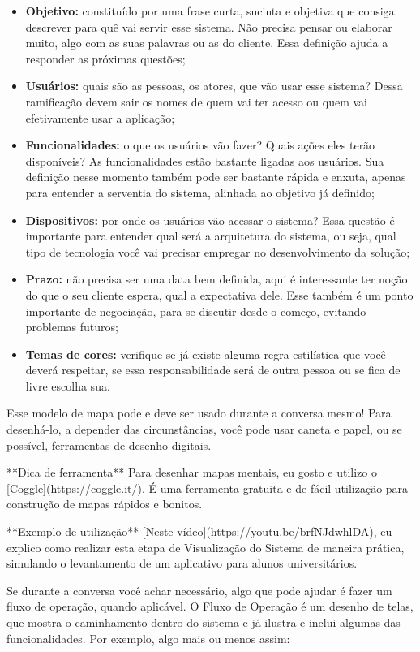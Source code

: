 \documentclass[a4paper, 12pt, oneside]{book}
\begin{document}
\begin{itemize}
    \item \textbf{Objetivo:} constituído por uma frase curta, sucinta e objetiva que consiga descrever para quê vai servir esse sistema. Não precisa pensar ou elaborar muito, algo com as suas palavras ou as do cliente. Essa definição ajuda a responder as próximas questões;
    \item \textbf{Usuários:} quais são as pessoas, os atores, que vão usar esse sistema? Dessa ramificação devem sair os nomes de quem vai ter acesso ou quem vai efetivamente usar a aplicação;
    \item \textbf{Funcionalidades:} o que os usuários vão fazer? Quais ações eles terão disponíveis? As funcionalidades estão bastante ligadas aos usuários. Sua definição nesse momento também pode ser bastante rápida e enxuta, apenas para entender a serventia do sistema, alinhada ao objetivo já definido;
    \item \textbf{Dispositivos:} por onde os usuários vão acessar o sistema? Essa questão é importante para entender qual será a arquitetura do sistema, ou seja, qual tipo de tecnologia você vai precisar empregar no desenvolvimento da solução;
    \item \textbf{Prazo:} não precisa ser uma data bem definida, aqui é interessante ter noção do que o seu cliente espera, qual a expectativa dele. Esse também é um ponto importante de negociação, para se discutir desde o começo, evitando problemas futuros;
    \item \textbf{Temas de cores:} verifique se já existe alguma regra estilística que você deverá respeitar, se essa responsabilidade será de outra pessoa ou se fica de livre escolha sua.
\end{itemize}


Esse modelo de mapa pode e deve ser usado durante a conversa mesmo! Para desenhá-lo, a depender das circunstâncias, você pode usar caneta e papel, ou se possível, ferramentas de desenho digitais.

**Dica de ferramenta**
Para desenhar mapas mentais, eu gosto e utilizo o [Coggle](https://coggle.it/). É uma ferramenta gratuita e de fácil utilização para construção de mapas rápidos e bonitos.

**Exemplo de utilização**
[Neste vídeo](https://youtu.be/brfNJdwhlDA), eu explico como realizar esta etapa de Visualização do Sistema de maneira prática, simulando o levantamento de um aplicativo para alunos universitários.

Se durante a conversa você achar necessário, algo que pode ajudar é fazer um fluxo de operação, quando aplicável. O Fluxo de Operação é um desenho de telas, que mostra o caminhamento dentro do sistema e já ilustra e inclui algumas das funcionalidades. Por exemplo, algo mais ou menos assim:
\end{document}

